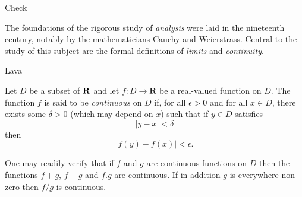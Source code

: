 \documentclass[a4paper,12pt]{article}
\begin{document}
Check

The foundations of the rigorous study of \emph{analysis}
were laid in the nineteenth century, notably by the
mathematicians Cauchy and Weierstrass. Central to the
study of this subject are the formal definitions of
\emph{limits} and \emph{continuity}.

Lava

Let $D$ be a subset of $\bf R$ and let
$f \colon D \to \mathbf{R}$ be a real-valued function on
$D$. The function $f$ is said to be \emph{continuous} on
$D$ if, for all $\epsilon > 0$ and for all $x \in D$,
there exists some $\delta > 0$ (which may depend on $x$)
such that if $y \in D$ satisfies
\[ |y - x| < \delta \]
then
\[ |f(y) - f(x)| < \epsilon. \]

One may readily verify that if $f$ and $g$ are continuous
functions on $D$ then the functions $f+g$, $f-g$ and
$f.g$ are continuous. If in addition $g$ is everywhere
non-zero then $f/g$ is continuous.
\end{document}
